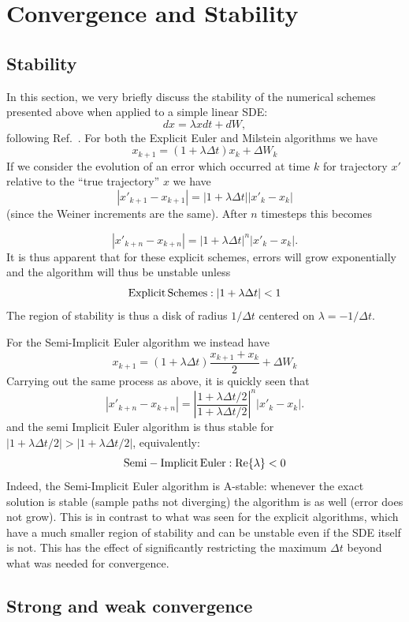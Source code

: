 \documentclass[onecolumn,notitlepage,pra,10pt,aps]{revtex4-1}
\newcommand {\be}{\begin{equation}}
\newcommand {\ee}{\end{equation}}
\begin{document}
\section{Convergence and Stability}

\subsection{Stability}

In this section, we very briefly discuss the stability of the numerical schemes presented above when applied to a simple linear SDE:
\be
dx= \lambda x dt +dW,
\ee
following Ref.~.  For both the Explicit Euler and Milstein algorithms we have
\be
x_{k+1}=(1+\lambda \Delta t)x_k + \Delta W_k
\ee
If we consider the evolution of an error which occurred at time $k$ for trajectory $x'$ relative to the ``true trajectory'' $x$ we have
\be
|x'_{k+1}-x_{k+1}|=|1+\lambda \Delta t||x'_{k}-x_{k}| 
\ee
(since the Weiner increments are the same).  After $n$ timesteps this becomes

\be
|x'_{k+n}-x_{k+n}|=|1+\lambda \Delta t|^n|x'_{k}-x_{k}| .
\ee
It is thus apparent that for these explicit schemes, errors will grow exponentially and the algorithm will thus be unstable unless
\be
{\rm Explicit\, Schemes}: |1+\lambda \Delta t|<1
\ee
The region of stability is thus a disk of radius $1/\Delta t$ centered on $\lambda=-1/\Delta t$.

For the Semi-Implicit Euler algorithm we instead have 
\be
x_{k+1}=(1+\lambda \Delta t)\frac{x_{k+1}+x_k}{2} + \Delta W_k
\ee
Carrying out the same process as above, it is quickly seen that
\be
|x'_{k+n}-x_{k+n}|=\left|\frac{1+\lambda \Delta t/2}{1+\lambda \Delta t/2}\right|^n|x'_{k}-x_{k}| .
\ee
and the semi Implicit Euler algorithm is thus stable for  $|{1+\lambda \Delta t/2}|>|{1+\lambda \Delta t/2}|$, equivalently:
\be
{\rm Semi-Implicit\, Euler}: {\rm Re}\{\lambda\}<0
\ee
Indeed, the Semi-Implicit Euler algorithm is A-stable: whenever the exact solution is stable (sample paths not diverging) the algorithm is as well (error does not grow).  This is in contrast to what was seen for the explicit algorithms, which have a much smaller region of stability and can be unstable even if the SDE itself is not.  This has the effect of significantly restricting the maximum $\Delta t$ beyond what was needed for convergence.

\subsection{Strong and weak convergence}
\end{document}
